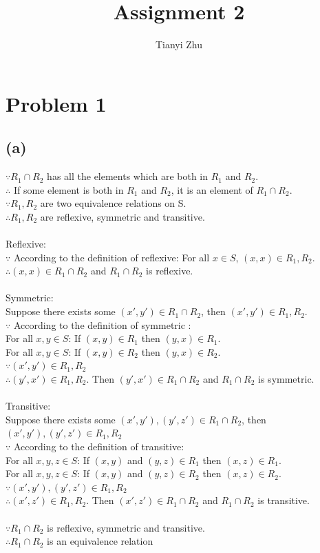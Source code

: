 \documentclass{article} %
\begin{document}
\title{Assignment 2}
\author{Tianyi Zhu} %
\maketitle %

\section*{Problem 1} %
\subsection*{(a)}
$\because R_1 \cap R_2$ has all the elements which are both in $R_1$ and $R_2$.\\
$\therefore$ If some element is both in $R_1$ and $R_2$, it is an element of $R_1 \cap R_2$.\\
$\because R_1, R_2 $ are two equivalence relations on S.\\
$\therefore R_1, R_2$ are reflexive, symmetric and transitive.\\
\\
Reflexive:\\
$\because$ According to the definition of reflexive: For all $x \in S$, $(x, x)\in R_1, R_2$.\\
$\therefore (x, x)\in R_1\cap R_2$ and $R_1 \cap R_2$ is reflexive.\\
\\
Symmetric:\\
Suppose there exists some $(x', y') \in R_1 \cap R_2$, then $(x', y') \in R_1, R_2$.\\
$\because$ According to the definition of symmetric : \\
For all $x, y \in S$: If $(x, y) \in R_1$ then $(y, x) \in R_1$. \\
For all $x, y \in S$: If $(x, y) \in R_2$ then $(y, x) \in R_2$. \\
$\because (x', y')\in R_1, R_2$\\
$\therefore (y', x') \in R_1, R_2$. Then $(y', x') \in R_1 \cap R_2$ and $R_1 \cap R_2$ is symmetric.\\
\\
Transitive:\\
Suppose there exists some $(x', y'), (y', z')\in R_1 \cap R_2$, then $(x', y'), (y', z')\in R_1, R_2$\\
$\because$ According to the definition of transitive: \\
For all $x, y, z \in S$: If $(x, y)$ and $(y, z) \in R_1$ then $(x, z) \in R_1$. \\
For all $x, y, z \in S$: If $(x, y)$ and $(y, z) \in R_2$ then $(x, z) \in R_2$. \\
$\because (x', y'), (y', z')\in R_1, R_2$\\
$\therefore (x', z') \in R_1, R_2$. Then $(x', z')\in R_1 \cap R_2$ and $R_1 \cap R_2$ is transitive.\\
\\
$\because R_1 \cap R_2$ is reflexive, symmetric and transitive. \\
$\therefore R_1 \cap R_2$ is an equivalence relation\\
\end{document}
